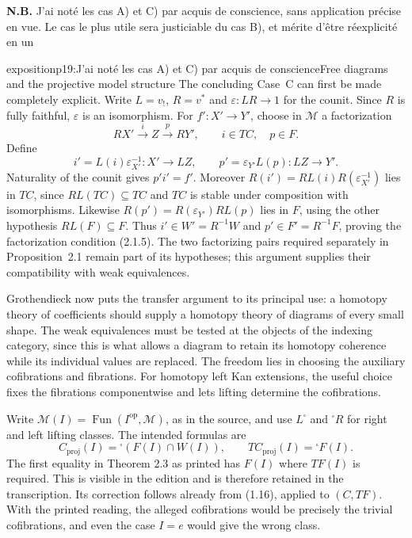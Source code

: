 \textbf{N.B.} J'ai noté les cas A) et C) par acquis de conscience, sans application précise en vue. Le cas le plus utile sera justiciable du cas B), et mérite d'être réexplicité en un

\begin{dcomment}{exposition}{p19:J'ai noté les cas A) et C) par acquis de conscience}{Free diagrams and the projective model structure}
The concluding Case~C can first be made completely explicit. Write $L=v_!$, $R=v^*$ and $\varepsilon:LR\to1$ for the counit. Since $R$ is fully faithful, $\varepsilon$ is an isomorphism. For $f':X'\to Y'$, choose in $\mathcal M$ a factorization
\[
 R X'\xrightarrow{i}Z\xrightarrow{p}R Y',
 \qquad i\in TC,\quad p\in F.
\]
Define
\[
 i'=L(i)\varepsilon_{X'}^{-1}:X'\longrightarrow LZ,
 \qquad p'=\varepsilon_{Y'}L(p):LZ\longrightarrow Y'.
\]
Naturality of the counit gives $p'i'=f'$. Moreover $R(i')=RL(i)R(\varepsilon_{X'}^{-1})$ lies in $TC$, since $RL(TC)\subseteq TC$ and $TC$ is stable under composition with isomorphisms. Likewise $R(p')=R(\varepsilon_{Y'})RL(p)$ lies in $F$, using the other hypothesis $RL(F)\subseteq F$. Thus $i'\in W'=R^{-1}W$ and $p'\in F'=R^{-1}F$, proving the factorization condition (2.1.5). The two factorizing pairs required separately in Proposition~2.1 remain part of its hypotheses; this argument supplies their compatibility with weak equivalences.

Grothendieck now puts the transfer argument to its principal use: a homotopy theory of coefficients should supply a homotopy theory of diagrams of every small shape. The weak equivalences must be tested at the objects of the indexing category, since this is what allows a diagram to retain its homotopy coherence while its individual values are replaced. The freedom lies in choosing the auxiliary cofibrations and fibrations. For homotopy left Kan extensions, the useful choice fixes the fibrations componentwise and lets lifting determine the cofibrations.

Write $\mathcal M(I)=\operatorname{Fun}(I^{\mathrm{op}},\mathcal M)$, as in the source, and use $L^{\square}$ and ${}^{\square}R$ for right and left lifting classes. The intended formulas are
\[
 C_{\mathrm{proj}}(I)={}^{\square}(F(I)\cap W(I)),
 \qquad
 TC_{\mathrm{proj}}(I)={}^{\square}F(I).
\]
The first equality in Theorem 2.3 as printed has $F(I)$ where $TF(I)$ is required. This is visible in the edition and is therefore retained in the transcription. Its correction follows already from (1.16), applied to $(C,TF)$. With the printed reading, the alleged cofibrations would be precisely the trivial cofibrations, and even the case $I=e$ would give the wrong class.


\end{dcomment}
